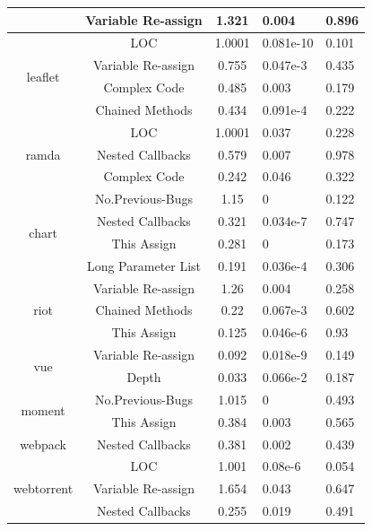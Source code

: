 \begin{table}[t]
\begin{tabular}{c|c|c|p{1.1cm}|p{1.3cm}}
		& Variable Re-assign & 1.321 & 0.004 & 0.896 \\ \hline
		\multirow{4}{*}{leaflet}
		& LOC & 1.0001 & 0.081e-10 & 0.101 \\ \cline{2-5}
		& Variable Re-assign & 0.755 & 0.047e-3 & 0.435 \\ \cline{2-5}
		& Complex Code & 0.485 & 0.003 & 0.179 \\ \cline{2-5}
		& Chained Methods & 0.434 & 0.091e-4 & 0.222 \\ \hline
		\multirow{3}{*}{ramda}
		& LOC & 1.0001 & 0.037 & 0.228 \\ \cline{2-5}
		& Nested Callbacks & 0.579 & 0.007 & 0.978 \\ \cline{2-5}
		& Complex Code & 0.242 & 0.046 & 0.322 \\ \hline
		\multirow{4}{*}{chart}
		& No.Previous-Bugs & 1.15 & 0 & 0.122 \\ \cline{2-5}
		& Nested Callbacks & 0.321 & 0.034e-7 & 0.747 \\ \cline{2-5}
		& This Assign & 0.281 & 0 & 0.173 \\ \cline{2-5}
		& Long Parameter List & 0.191 & 0.036e-4 & 0.306 \\ \hline
		\multirow{3}{*}{riot}
		& Variable Re-assign & 1.26 & 0.004 & 0.258 \\ \cline{2-5}
		& Chained Methods & 0.22 & 0.067e-3 & 0.602 \\ \cline{2-5}
		& This Assign & 0.125 & 0.046e-6 & 0.93 \\ \hline
		\multirow{2}{*}{vue}
		& Variable Re-assign & 0.092 & 0.018e-9 & 0.149 \\ \cline{2-5}
		& Depth & 0.033 & 0.066e-2 & 0.187 \\ \hline
		\multirow{2}{*}{moment}
		& No.Previous-Bugs & 1.015 & 0 & 0.493 \\ \cline{2-5}
		& This Assign & 0.384 & 0.003 & 0.565 \\ \hline
		\multirow{1}{*}{webpack}
		& Nested Callbacks & 0.381 & 0.002 & 0.439 \\ \hline
		\multirow{3}{*}{webtorrent}
		& LOC & 1.001 & 0.08e-6 & 0.054 \\ \cline{2-5}
		& Variable Re-assign & 1.654 & 0.043 & 0.647 \\ \cline{2-5}
		& Nested Callbacks & 0.255 & 0.019 & 0.491 \\ \hline
	\end{tabular}
	\label{smelltypes3}
	\vspace{-15pt}
\end{table}

